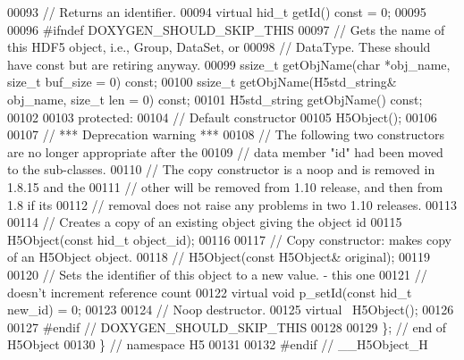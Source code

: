 \begin{DoxyCode}
00093         \textcolor{comment}{// Returns an identifier.}
00094         \textcolor{keyword}{virtual} hid\_t getId() \textcolor{keyword}{const} = 0;
00095 
00096 \textcolor{preprocessor}{#ifndef DOXYGEN\_SHOULD\_SKIP\_THIS}
00097         \textcolor{comment}{// Gets the name of this HDF5 object, i.e., Group, DataSet, or}
00098         \textcolor{comment}{// DataType.  These should have const but are retiring anyway.}
00099         ssize\_t getObjName(\textcolor{keywordtype}{char} *obj\_name, \textcolor{keywordtype}{size\_t} buf\_size = 0) \textcolor{keyword}{const};
00100         ssize\_t getObjName(H5std\_string& obj\_name, \textcolor{keywordtype}{size\_t} len = 0) \textcolor{keyword}{const};
00101         H5std\_string getObjName() \textcolor{keyword}{const};
00102 
00103    \textcolor{keyword}{protected}:
00104         \textcolor{comment}{// Default constructor}
00105         H5Object();
00106 
00107         \textcolor{comment}{// *** Deprecation warning ***}
00108         \textcolor{comment}{// The following two constructors are no longer appropriate after the}
00109         \textcolor{comment}{// data member "id" had been moved to the sub-classes.}
00110         \textcolor{comment}{// The copy constructor is a noop and is removed in 1.8.15 and the}
00111         \textcolor{comment}{// other will be removed from 1.10 release, and then from 1.8 if its}
00112         \textcolor{comment}{// removal does not raise any problems in two 1.10 releases.}
00113 
00114         \textcolor{comment}{// Creates a copy of an existing object giving the object id}
00115         H5Object(\textcolor{keyword}{const} hid\_t object\_id);
00116 
00117         \textcolor{comment}{// Copy constructor: makes copy of an H5Object object.}
00118         \textcolor{comment}{// H5Object(const H5Object& original);}
00119 
00120         \textcolor{comment}{// Sets the identifier of this object to a new value. - this one}
00121         \textcolor{comment}{// doesn't increment reference count}
00122         \textcolor{keyword}{virtual} \textcolor{keywordtype}{void} p\_setId(\textcolor{keyword}{const} hid\_t new\_id) = 0;
00123 
00124         \textcolor{comment}{// Noop destructor.}
00125         \textcolor{keyword}{virtual} ~H5Object();
00126 
00127 \textcolor{preprocessor}{#endif // DOXYGEN\_SHOULD\_SKIP\_THIS}
00128 
00129 \}; \textcolor{comment}{// end of H5Object}
00130 \} \textcolor{comment}{// namespace H5}
00131 
00132 \textcolor{preprocessor}{#endif // \_\_H5Object\_H}
\end{DoxyCode}

